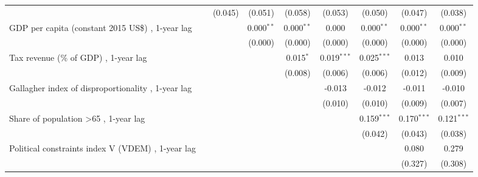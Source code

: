 \begin{table}[htbp]
\begin{tabular}{lcccccccc}
                                                                                  &               & (0.045)       & (0.051)       & (0.058)       & (0.053)       & (0.050)       & (0.047)       & (0.038)\\   
      GDP per capita (constant 2015 US\$) , 1-year lag                            &               &               & 0.000$^{**}$  & 0.000$^{**}$  & 0.000         & 0.000$^{**}$  & 0.000$^{**}$  & 0.000$^{**}$\\   
                                                                                  &               &               & (0.000)       & (0.000)       & (0.000)       & (0.000)       & (0.000)       & (0.000)\\   
      Tax revenue (\% of GDP) , 1-year lag                                        &               &               &               & 0.015$^{*}$   & 0.019$^{***}$ & 0.025$^{***}$ & 0.013         & 0.010\\   
                                                                                  &               &               &               & (0.008)       & (0.006)       & (0.006)       & (0.012)       & (0.009)\\   
      Gallagher index of disproportionality , 1-year lag                          &               &               &               &               & -0.013        & -0.012        & -0.011        & -0.010\\   
                                                                                  &               &               &               &               & (0.010)       & (0.010)       & (0.009)       & (0.007)\\   
      Share of population >65 , 1-year lag                                        &               &               &               &               &               & 0.159$^{***}$ & 0.170$^{***}$ & 0.121$^{***}$\\   
                                                                                  &               &               &               &               &               & (0.042)       & (0.043)       & (0.038)\\   
      Political constraints index V (VDEM) , 1-year lag                           &               &               &               &               &               &               & 0.080         & 0.279\\   
                                                                                  &               &               &               &               &               &               & (0.327)       & (0.308)\\   

\end{tabular}
\end{table}

